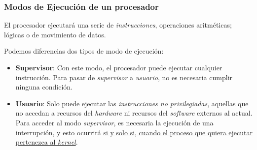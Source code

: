 \subsubsection{Modos de Ejecución de un procesador}
\noindent El procesador ejecutará una serie de \textit{instrucciones}, operaciones aritméticas; lógicas o de movimiento de datos.
\par \vspace{.2cm} \noindent Podemos diferencias dos tipos de modo de ejecución:
\begin{itemize}
        \item \textbf{Supervisor}: Con este modo, el procesador puede ejecutar cualquier instrucción. Para pasar de \textit{supervisor} a \textit{usuario}, no es necesaria cumplir ninguna condición.
        \item \textbf{Usuario}: Solo puede ejecutar las \textit{instrucciones no privilegiadas}, aquellas que no accedan a recursos del \textit{hardware} ni recursos del \textit{software} externos al actual. Para acceder al modo \textit{supervisor}, es necesaria la ejecución de una interrupción, y esto ocurrirá \underline{si y solo si, cuando el proceso que quiera ejecutar pertenezca al \textit{kernel}}.
\end{itemize}